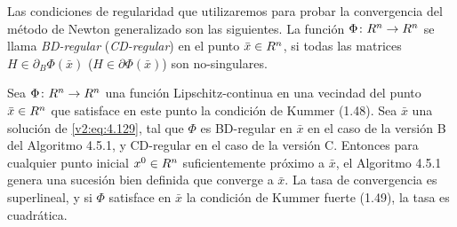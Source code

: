 Las condiciones de regularidad que utilizaremos para probar la convergencia del método de Newton generalizado son las siguientes. La función $\Phi \colon R^n \to R^n$ se llama \textit{BD-regular} (\textit{CD-regular}) en el punto $\bar{x} \in R^n$, si todas las matrices $H \in \partial_B \Phi(\bar{x})$ ($H \in \partial \Phi(\bar{x})$) son no-singulares.

\begin{theorem}\label{v2:thm:4.5.1}
    Sea $\Phi \colon R^n \to R^n$ una función Lipschitz-continua en una vecindad del punto $\bar{x} \in R^n$ que satisface en este punto la condición de Kummer (1.48). Sea $\bar{x}$ una solución de \eqref{v2:eq:4.129}, tal que $\Phi$ es BD-regular en $\bar{x}$ en el caso de la versión B del Algoritmo 4.5.1, y CD-regular en el caso de la versión C.
    Entonces para cualquier punto inicial $x^0 \in R^n$ suficientemente próximo a $\bar{x}$, el Algoritmo 4.5.1 genera una sucesión bien definida que converge a $\bar{x}$. La tasa de convergencia es superlineal, y si $\Phi$ satisface en $\bar{x}$ la condición de Kummer fuerte (1.49), la tasa es cuadrática.
\end{theorem}
